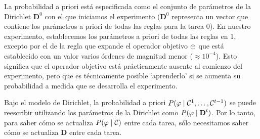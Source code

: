 La probabilidad a priori  está especificada como el conjunto de parámetros de la Dirichlet $\textbf{D}^{0}$ con el que iniciamos el experimento ($\textbf{D}^{0}$ representa un vector que contiene los parámetros a priori de todas las reglas para la tarea $0$). En nuestro experimento, establecemos los parámetros a priori de todas las reglas en 1, excepto por el de la regla que expande el operador objetivo $\oplus$ que está establecido con un valor varios órdenes de magnitud menor ($\approx 10^{-4}$). Esto significa que el operador objetivo está prácticamente ausente al comienzo del experimento, pero que es técnicamente posible `aprenderlo' si se aumenta su probabilidad a medida que se desarrolla el experimento.


Bajo el modelo de Dirichlet, la probabilidad a priori $P(\varphi\mid \mathcal{C}^{1},\dots,\mathcal{C}^{t-1})$ se puede reescribir utilizando los parámetros de la Dirichlet como $P(\varphi\mid\textbf{D}^{t})$. Por lo tanto, para saber cómo se actualiza $P(\varphi\mid \mathcal{C})$ entre cada tarea, sólo necesitamos saber cómo se actualiza  $\textbf{D}$ entre cada tarea.



